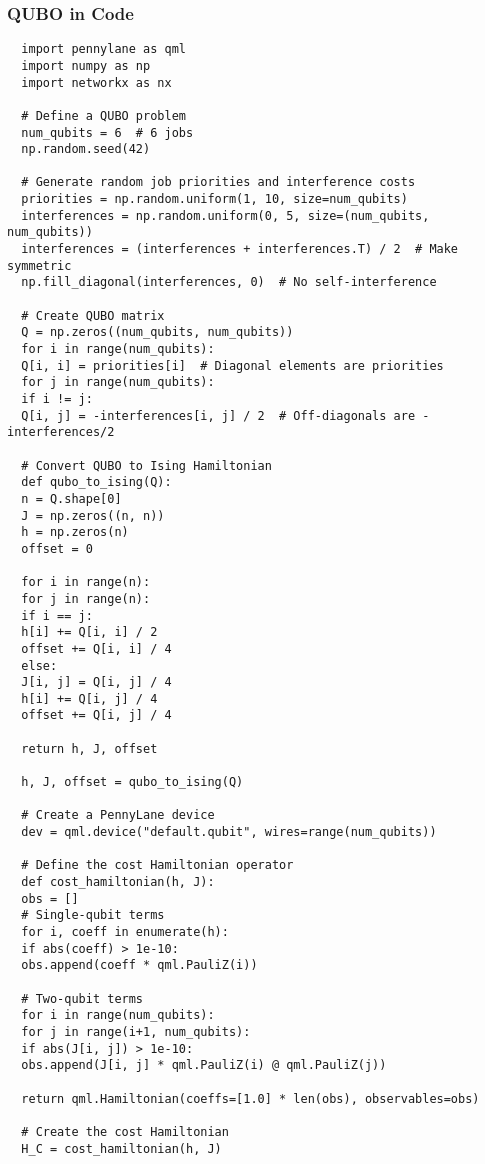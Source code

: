 \vspace{0.3cm}

\subsubsection*{QUBO in Code}

\begin{verbatim}
  import pennylane as qml
  import numpy as np
  import networkx as nx

  # Define a QUBO problem
  num_qubits = 6  # 6 jobs
  np.random.seed(42)

  # Generate random job priorities and interference costs
  priorities = np.random.uniform(1, 10, size=num_qubits)
  interferences = np.random.uniform(0, 5, size=(num_qubits, num_qubits))
  interferences = (interferences + interferences.T) / 2  # Make symmetric
  np.fill_diagonal(interferences, 0)  # No self-interference

  # Create QUBO matrix
  Q = np.zeros((num_qubits, num_qubits))
  for i in range(num_qubits):
  Q[i, i] = priorities[i]  # Diagonal elements are priorities
  for j in range(num_qubits):
  if i != j:
  Q[i, j] = -interferences[i, j] / 2  # Off-diagonals are -interferences/2

  # Convert QUBO to Ising Hamiltonian
  def qubo_to_ising(Q):
  n = Q.shape[0]
  J = np.zeros((n, n))
  h = np.zeros(n)
  offset = 0

  for i in range(n):
  for j in range(n):
  if i == j:
  h[i] += Q[i, i] / 2
  offset += Q[i, i] / 4
  else:
  J[i, j] = Q[i, j] / 4
  h[i] += Q[i, j] / 4
  offset += Q[i, j] / 4

  return h, J, offset

  h, J, offset = qubo_to_ising(Q)

  # Create a PennyLane device
  dev = qml.device("default.qubit", wires=range(num_qubits))

  # Define the cost Hamiltonian operator
  def cost_hamiltonian(h, J):
  obs = []
  # Single-qubit terms
  for i, coeff in enumerate(h):
  if abs(coeff) > 1e-10:
  obs.append(coeff * qml.PauliZ(i))

  # Two-qubit terms
  for i in range(num_qubits):
  for j in range(i+1, num_qubits):
  if abs(J[i, j]) > 1e-10:
  obs.append(J[i, j] * qml.PauliZ(i) @ qml.PauliZ(j))

  return qml.Hamiltonian(coeffs=[1.0] * len(obs), observables=obs)

  # Create the cost Hamiltonian
  H_C = cost_hamiltonian(h, J)


\end{verbatim}
